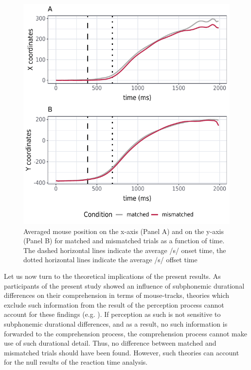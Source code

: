 \begin{figure}
    \centering
    \includegraphics[]{figures/fig7.12.pdf}
    \caption{Averaged mouse position on the x-axis (Panel A) and on the y-axis (Panel B) for matched and mismatched trials as a function of time. The dashed horizontal lines indicate the average /s/ onset time, the dotted horizontal lines indicate the average /s/ offset time}
    \label{fig:7_12}
\end{figure}

Let us now turn to the theoretical implications of the present results. As participants of the present study showed an influence of subphonemic durational differences on their comprehension in terms of mouse-tracks, theories which exclude such information from the result of the perception process cannot account for these findings (e.g. \cite{Klatt1979, McClelland1986, Norris1994, Norris2008}). If perception as such is not sensitive to subphonemic durational differences, and as a result, no such information is forwarded to the comprehension process, the comprehension process cannot make use of such durational detail. Thus, no difference between matched and mismatched trials should have been found. However, such theories can account for the null results of the reaction time analysis.

